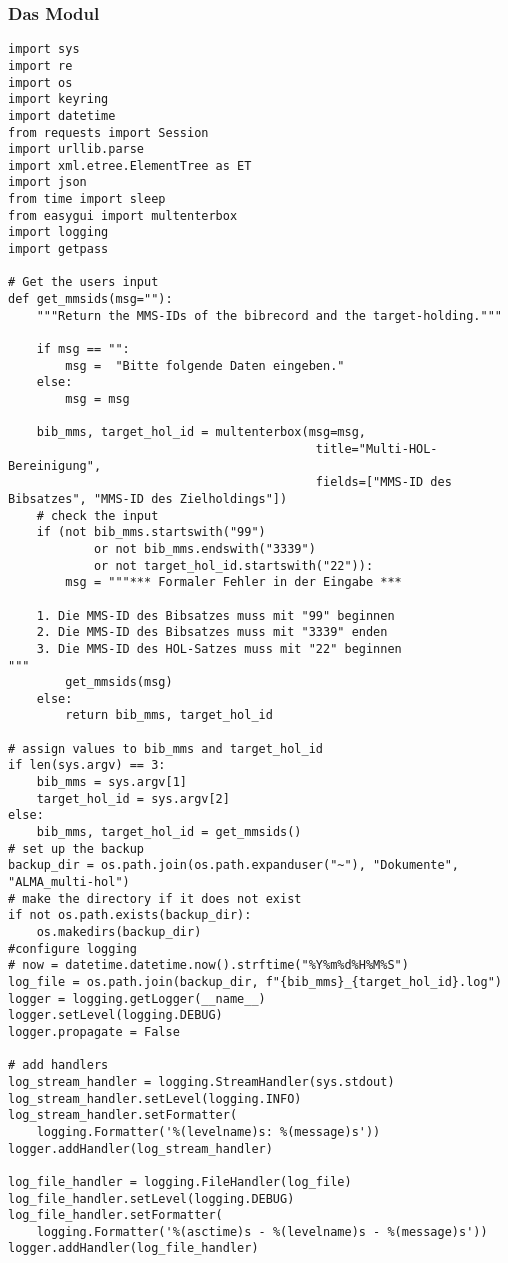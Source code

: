 \documentclass[10pt, a4paper]{scrartcl}
\begin{document}
\subsubsection{Das Modul}
\label{sec:org2db2331}
\begin{verbatim}
import sys
import re
import os
import keyring
import datetime
from requests import Session
import urllib.parse
import xml.etree.ElementTree as ET
import json
from time import sleep
from easygui import multenterbox
import logging
import getpass

# Get the users input
def get_mmsids(msg=""):
    """Return the MMS-IDs of the bibrecord and the target-holding."""

    if msg == "":
        msg =  "Bitte folgende Daten eingeben."
    else:
        msg = msg

    bib_mms, target_hol_id = multenterbox(msg=msg,
                                           title="Multi-HOL-Bereinigung",
                                           fields=["MMS-ID des Bibsatzes", "MMS-ID des Zielholdings"])
    # check the input
    if (not bib_mms.startswith("99")
            or not bib_mms.endswith("3339")
            or not target_hol_id.startswith("22")):
        msg = """*** Formaler Fehler in der Eingabe ***

    1. Die MMS-ID des Bibsatzes muss mit "99" beginnen
    2. Die MMS-ID des Bibsatzes muss mit "3339" enden
    3. Die MMS-ID des HOL-Satzes muss mit "22" beginnen
"""
        get_mmsids(msg)
    else:
        return bib_mms, target_hol_id

# assign values to bib_mms and target_hol_id
if len(sys.argv) == 3:
    bib_mms = sys.argv[1]
    target_hol_id = sys.argv[2]
else:
    bib_mms, target_hol_id = get_mmsids()
# set up the backup
backup_dir = os.path.join(os.path.expanduser("~"), "Dokumente", "ALMA_multi-hol")
# make the directory if it does not exist
if not os.path.exists(backup_dir):
    os.makedirs(backup_dir)
#configure logging
# now = datetime.datetime.now().strftime("%Y%m%d%H%M%S")
log_file = os.path.join(backup_dir, f"{bib_mms}_{target_hol_id}.log")
logger = logging.getLogger(__name__)
logger.setLevel(logging.DEBUG)
logger.propagate = False

# add handlers
log_stream_handler = logging.StreamHandler(sys.stdout)
log_stream_handler.setLevel(logging.INFO)
log_stream_handler.setFormatter(
    logging.Formatter('%(levelname)s: %(message)s'))
logger.addHandler(log_stream_handler)

log_file_handler = logging.FileHandler(log_file)
log_file_handler.setLevel(logging.DEBUG)
log_file_handler.setFormatter(
    logging.Formatter('%(asctime)s - %(levelname)s - %(message)s'))
logger.addHandler(log_file_handler)


\end{verbatim}
\end{document}
